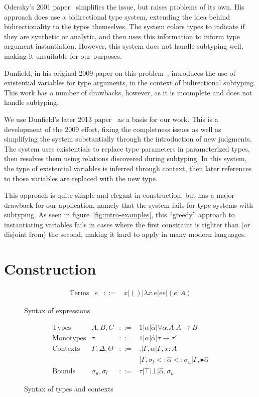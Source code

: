 \documentclass{sig-alternate}
\newcommand{\botbound}{\sigma_{l}}
\newcommand{\topbound}{\sigma_{u}}
\newcommand{\marker}[1]{{\scriptscriptstyle {\blacktriangleright #1}}}
\newcommand{\tst}{{\scriptstyle{<:}}}
\newcommand{\bound}[3]{#1 \tst #2 \tst #3}
\begin{document}
Odersky's 2001 paper~\cite{odersky2001colored} simplifies the issue, but raises problems of its own. His approach does use a bidirectional type system, extending the idea behind bidirectionality to the types themselves. The system colors types to indicate if they are synthetic or analytic, and then uses this information to inform type argument instantiation. However, this system does not handle subtyping well, making it unsuitable for our purposes.

Dunfield, in his original 2009 paper on this problem~\cite{Dunfield09:polymorphism}, introduces the use of existential variables for type arguments, in the context of bidirectional subtyping. This work has a number of drawbacks, however, as it is incomplete and does not handle subtyping.

We use Dunfield's later 2013 paper~\cite{Dunfield:2013:CEB:2544174.2500582} as a basis for our work. This is a development of the 2009 effort, fixing the completness issues as well as simplifying the system substantially through the introduction of new judgments. The system uses existentials to replace type parameters in parameterized types, then resolves them using relations discovered during subtyping. In this system, the type of existential variables is inferred through context, then later references to those variables are replaced with the new type.

This approach is quite simple and elegant in construction, but has a major drawback for our application, namely that the system fails for type systems with subtyping. As seen in figure~\ref{fig:intro-examples}, this ``greedy'' approach to instantiating variables fails in cases where the first constraint is tighter than (or disjoint from) the second, making it hard to apply in many modern languages. 
\section{Construction}

\begin{figure}
\[
\begin{array}{lccl}
\text{Terms} & e &::=& x | () | \lambda x.e | e e | (e : A)
\end{array}
\]
\caption{Syntax of expressions}
\label{fig:term}
\end{figure}

\begin{figure}
\[
\begin{array}{lccl}
\text{Types} & A,B,C &::=& 1 | \alpha | \hat{\alpha} | \forall \alpha.A | A \rightarrow B\\
\text{Monotypes} & \tau &::=& 1 | \alpha | \hat{\alpha} | \tau \rightarrow \tau'\\
\text{Contexts} & \Gamma, \Delta, \Theta &::=& . | \Gamma, \alpha | \Gamma, x:A \\ &&& | \Gamma, \bound{\botbound}{\hat{\alpha}}{\topbound} | \Gamma, \marker{\hat{\alpha}}\\
\text{Bounds} & \topbound, \botbound &::=& \tau | \top | \bot | \hat{\alpha}, \topbound
\end{array}
\]
\caption{Syntax of types and contexts}
\label{fig:cons}
\end{figure}
%
 
\end{document}
